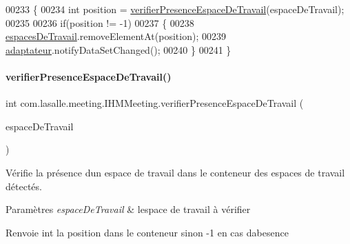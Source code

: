 \begin{DoxyCode}
00233     \{
00234         \textcolor{keywordtype}{int} position = \hyperlink{classcom_1_1lasalle_1_1meeting_1_1_i_h_m_meeting_a402dc23f375fae1f1faa3d5728cdad00}{verifierPresenceEspaceDeTravail}(espaceDeTravail);
00235 
00236         \textcolor{keywordflow}{if}(position != -1)
00237         \{
00238             \hyperlink{classcom_1_1lasalle_1_1meeting_1_1_i_h_m_meeting_acba41978aec60c27f07db774f9b68b68}{espacesDeTravail}.removeElementAt(position);
00239             \hyperlink{classcom_1_1lasalle_1_1meeting_1_1_i_h_m_meeting_ac103010077163ba43b830ffe524f476d}{adaptateur}.notifyDataSetChanged();
00240         \}
00241     \}
\end{DoxyCode}
\mbox{\label{classcom_1_1lasalle_1_1meeting_1_1_i_h_m_meeting_a402dc23f375fae1f1faa3d5728cdad00}} 
\paragraph{\texorpdfstring{verifier\+Presence\+Espace\+De\+Travail()}{verifierPresenceEspaceDeTravail()}}
{\footnotesize\ttfamily int com.\+lasalle.\+meeting.\+I\+H\+M\+Meeting.\+verifier\+Presence\+Espace\+De\+Travail (\begin{DoxyParamCaption}\item[{\hyperlink{classcom_1_1lasalle_1_1meeting_1_1_espace_de_travail}{Espace\+De\+Travail}}]{espace\+De\+Travail }\end{DoxyParamCaption})\hspace{0.3cm}{\ttfamily [private]}}



Vérifie la présence d\textquotesingle{}un espace de travail dans le conteneur des espaces de travail détectés. 


\begin{DoxyParams}{Paramètres}
{\em espace\+De\+Travail} & l\textquotesingle{}espace de travail à vérifier \\
\hline
\end{DoxyParams}
\begin{DoxyReturn}{Renvoie}
int la position dans le conteneur sinon -\/1 en cas d\textquotesingle{}abesence 
\end{DoxyReturn}



